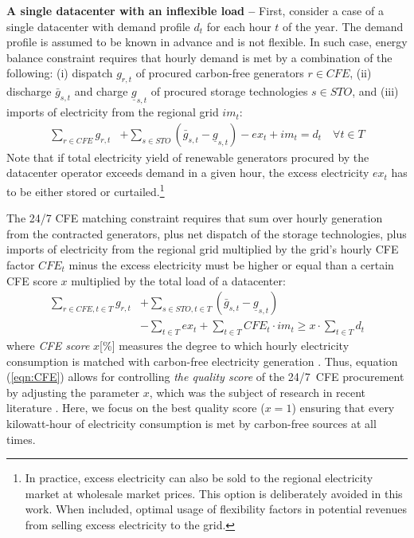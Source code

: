 \textbf{A single datacenter with an inflexible load --} First, consider a case of a single datacenter with demand profile $d_{t}$ for each hour $t$ of the year. The demand profile is assumed to be known in advance and is not flexible. In such case, energy balance constraint requires that hourly demand is met by a combination of the following: (i) dispatch $g_{r,t}$ of procured carbon-free generators $r\in CFE$, (ii) discharge $\bar{g}_{s,t}$ and charge $\underline{g}_{s,t}$ of procured storage technologies $s\in STO$, and (iii) imports of electricity from the regional grid $im_{t}$:
\begin{equation}
    \begin{split}
        \sum_{r\in CFE} g_{r,t} &+ \sum_{s\in STO} \left(\bar{g}_{s,t} - \underline{g}_{s,t}\right) - ex_t + im_t = d_t \quad \forall t \in T
    \end{split}
\label{eqn:inflexnb}
\end{equation}
Note that if total electricity yield of renewable generators procured by the datacenter operator exceeds demand in a given hour, the excess electricity $ex_t$ has to be either stored or curtailed.\footnote{In practice, excess electricity can also be sold to the regional electricity market at wholesale market prices. This option is deliberately avoided in this work. When included, optimal usage of flexibility factors in potential revenues from selling excess electricity to the grid.}

The 24/7 CFE matching constraint requires that sum over hourly generation from the contracted generators, plus net dispatch of the storage technologies, plus imports of electricity from the regional grid multiplied by the grid's hourly CFE factor $CFE_t$ minus the excess electricity must be higher or equal than a certain CFE score $x$ multiplied by the total load of a datacenter:
\begin{equation}
    \begin{split}
        \sum_{r\in CFE, t\in T} g_{r,t} &+ \sum_{s\in STO, t\in T} \left(\bar{g}_{s,t} - \underline{g}_{s,t}\right) \\
        &- \sum_{t\in T} ex_t + \sum_{t\in T} CFE_t \cdot im_t \geq x \cdot \sum_{t\in T} d_t
    \end{split}
\label{eqn:CFE}
\end{equation}
\noindent where \textit{CFE score} $x$[\%] measures the degree to which hourly electricity consumption is matched with carbon-free electricity generation \cite{google-methodologies}. Thus, equation (\ref{eqn:CFE}) allows for controlling \textit{the quality score} of the 24/7~CFE procurement by adjusting the parameter $x$, which was the subject of research in recent literature \cite{riepinMeansCostsSystemlevel2023,xu-247CFE-report}. Here, we focus on the best quality score ($x=1$) ensuring that every kilowatt-hour of electricity consumption is met by carbon-free sources at all times.

